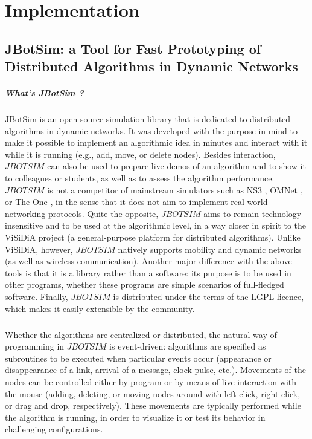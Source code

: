 \chapter{Implementation}
\section{JBotSim: a Tool for Fast Prototyping of Distributed Algorithms in Dynamic Networks}
\paragraph{What's JBotSim ?}JBotSim is an open source simulation library that is dedicated to distributed algorithms in dynamic networks. It was developed with the purpose in mind to make it possible to implement an algorithmic idea in minutes and interact with it while it is running (e.g., add, move, or delete nodes). Besides interaction, $JBOTSIM$ can also be used to prepare live demos of an algorithm and to show it to colleagues or students, as well as to assess the algorithm performance. $JBOTSIM$ is not a competitor of mainstream simulators such as NS3 \cite{35}, OMNet \cite{40}, or The One \cite{38}, in the sense that it does not aim to implement real-world networking protocols. Quite the opposite, $JBOTSIM$ aims to remain technology-insensitive and to be used at the algorithmic level, in a way closer in spirit to the ViSiDiA project (a general-purpose platform for distributed algorithms). Unlike ViSiDiA, however, $JBOTSIM$ natively supports mobility and dynamic networks (as well as wireless communication). Another major difference with the above tools is that it is a library rather than a software: its purpose is to be used in other programs, whether these programs are simple scenarios of full-fledged software. Finally, $JBOTSIM$ is distributed under the terms of the LGPL licence, which makes it easily extensible by the community.
\paragraph{}Whether the algorithms are centralized or distributed, the natural way of programming in $JBOTSIM$ is event-driven: algorithms are specified as subroutines to be executed when particular events occur (appearance or disappearance of a link, arrival of a message, clock pulse, etc.). Movements of the nodes can be controlled either by program or by means of live interaction with the mouse (adding, deleting, or moving nodes around with left-click, right-click, or drag and drop, respectively). These movements are typically performed while the algorithm is running, in order to visualize it or test its behavior in challenging configurations.
